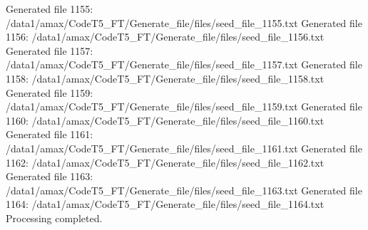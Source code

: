 Generated file 1155: /data1/amax/CodeT5_FT/Generate_file/files/seed_file_1155.txt
Generated file 1156: /data1/amax/CodeT5_FT/Generate_file/files/seed_file_1156.txt
Generated file 1157: /data1/amax/CodeT5_FT/Generate_file/files/seed_file_1157.txt
Generated file 1158: /data1/amax/CodeT5_FT/Generate_file/files/seed_file_1158.txt
Generated file 1159: /data1/amax/CodeT5_FT/Generate_file/files/seed_file_1159.txt
Generated file 1160: /data1/amax/CodeT5_FT/Generate_file/files/seed_file_1160.txt
Generated file 1161: /data1/amax/CodeT5_FT/Generate_file/files/seed_file_1161.txt
Generated file 1162: /data1/amax/CodeT5_FT/Generate_file/files/seed_file_1162.txt
Generated file 1163: /data1/amax/CodeT5_FT/Generate_file/files/seed_file_1163.txt
Generated file 1164: /data1/amax/CodeT5_FT/Generate_file/files/seed_file_1164.txt
Processing completed.
